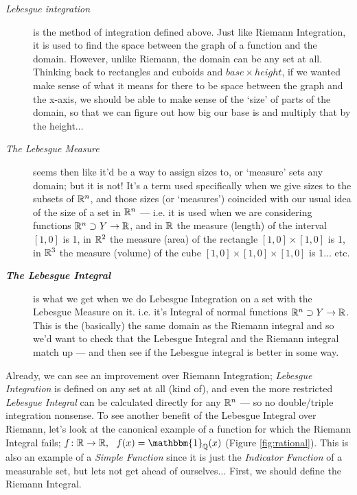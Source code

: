 \begin{description}
\item[\em Lebesgue integration\/] is the method of integration defined above. Just like Riemann Integration, it is used to find the space between the graph of a function and the domain. However, unlike Riemann, the domain can be any set at all. Thinking back to rectangles and cuboids and $base \times height$, if we wanted make sense of what it means for there to be space between the graph and the x-axis, we should be able to make sense of the `size' of parts of the domain, so that we can figure out how big our base is and multiply that by the height$\ldots$
%
\item[\em The Lebesgue Measure\/] seems then like it'd be a way to assign sizes to, or `measure' sets any domain; but it is not! It's a term used specifically when we give sizes to the subsets of $\mathbb{R}^n$, and those sizes (or `measures') coincided with our usual idea of the size of a set in $\mathbb{R}^n$ --- i.e. it is used when we are considering functions $\mathbb{R}^n \supset Y \rightarrow \mathbb{R}$, and in $\mathbb{R}$ the measure (length) of the interval $[1, 0]$ is 1, in $\mathbb{R}^2$ the measure (area) of the rectangle $[1, 0] \times [1, 0]$ is 1, in $\mathbb{R}^3$ the measure (volume) of the cube $[1, 0] \times [1, 0] \times [1, 0]$ is 1$\ldots$ etc. 
%
\item[\bf \em The Lebesgue Integral\/] is what we get when we do Lebesgue Integration on a set with the Lebesgue Measure on it. i.e. it's Integral of normal functions $\mathbb{R}^n \supset Y \rightarrow \mathbb{R}$. This is the (basically) the same domain as the Riemann integral and so we'd want to check that the Lebesgue Integral and the Riemann integral match up --- and then see if the Lebesgue integral is better in some way.
\end{description}

Already, we can see an improvement over Riemann Integration; \emph{Lebesgue Integration} is defined on any set at all (kind of), and even the more restricted \emph{Lebesgue Integral} can be calculated directly for any $\mathbb{R}^n$ --- so no double/triple integration nonsense. To see another benefit of the Lebesgue Integral over Riemann, let's look at the canonical example of a function for which the Riemann Integral fails; $f\colon \R \rightarrow \R,\ \ f(x) = \mathbbm{1}_\Q(x)$ (Figure \ref{fig:rational}). This is also an example of a \emph{Simple Function} since it is just the \emph{Indicator Function} of a measurable set, but lets not get ahead of ourselves$\ldots$ First, we should define the Riemann Integral. 

